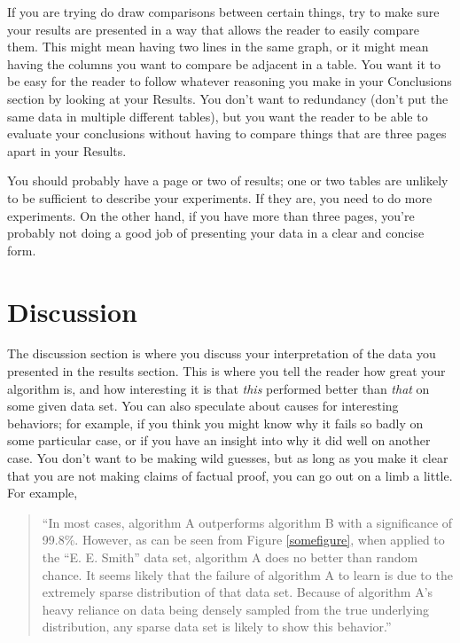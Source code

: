 \documentclass[12pt, letterpaper]{article}
\begin{document}
If you are trying do draw comparisons between certain things, try to make sure
your results are presented in a way that allows the reader to easily compare
them.  This might mean having two lines in the same graph, or it might mean
having the columns you want to compare be adjacent in a table.  You want it to
be easy for the reader to follow whatever reasoning you make in your Conclusions
section by looking at your Results.  You don't want to redundancy (don't put the
same data in multiple different tables), but you want the reader to be able to
evaluate your conclusions without having to compare things that are three pages
apart in your Results.

You should probably have a page or two of results; one or two tables are unlikely to be
sufficient to describe your experiments.  If they are, you need to do more
experiments.  On the other hand, if you have more than three pages, you're
probably not doing a good job of presenting your data in a clear and concise
form.

\section{Discussion}
The discussion section is where you discuss your interpretation of the data you
presented in the results section.  This is where you tell the reader how great
your algorithm is, and how interesting it is that \emph{this} performed better
than \emph{that} on some given data set.  You can also speculate about causes
for interesting behaviors; for example, if you think you might know why it fails
so badly on some particular case, or if you have an insight into why it did well
on another case.  You don't want to be making wild guesses, but as long as you
make it clear that you are not making claims of factual proof, you can go out on
a limb a little.  For example,

\begin{quote}
``In most cases, algorithm A outperforms algorithm B with a significance of
99.8\%.  However, as can be seen from Figure \ref{somefigure}, when applied to
the ``E. E. Smith'' data set, algorithm A does no better than random chance.  It
seems likely that the failure of algorithm A to learn is due to the extremely
sparse distribution of that data set.  Because of algorithm A's heavy reliance
on data being densely sampled from the true underlying distribution, any sparse
data set is likely to show this behavior.''
\end{quote}
\end{document}
